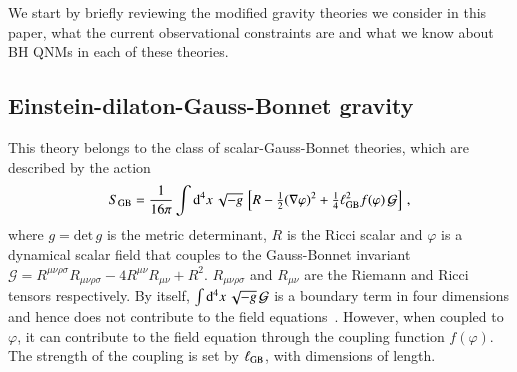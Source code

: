 \documentclass[twocolumn,
               prd,
               aps,
               superscriptaddress,
               tightenlines,
               nofootinbib,
               eqsecnum,
               amsfonts,
               amsmath,
               longbibliography]{revtex4-1}
\newcommand{\dV}{{\rm d}^{4}x \, \sqrt{-g} \,}
\begin{document}
We start by briefly reviewing the modified gravity theories we consider in this
paper, what the current observational constraints are and what we know
about BH QNMs in each of these theories.

\subsection{Einstein-dilaton-Gauss-Bonnet gravity}
\label{sec:review_edgb}

This theory belongs to the class of scalar-Gauss-Bonnet theories, which are
described by the action
%
\begin{equation} \label{eq:action_sgb}
    S_{\rm GB} = \frac{1}{16 \pi}
    \int \dV
    \left[
    R - \tfrac{1}{2}(\nabla \varphi)^2
    + \tfrac{1}{4} \ell^{2}_{\rm GB} f(\varphi) \, \mathcal{G}
    \right]\,,
\end{equation}
%
where $g = \textrm{det} \, g$ is the metric determinant, $R$ is the Ricci
scalar and $\varphi$ is a dynamical scalar field that couples to the
Gauss-Bonnet invariant
%
$\mathcal{G} =
R^{\mu\nu\rho\sigma}R_{\mu\nu\rho\sigma}
- 4 R^{\mu\nu}R_{\mu\nu}
+ R^2$.
%
$R_{\mu\nu\rho\sigma}$ and $R_{\mu\nu}$ are the Riemann and Ricci tensors respectively.
%
By itself, $\int \dV \mathcal{G}$ is a boundary term in four dimensions
and hence does not contribute to the field equations~\cite{Myers:1987yn}.
%
However,  when coupled to $\varphi$, it can contribute to the field equation
through the coupling function $f(\varphi)$. The strength of the coupling is
set by $\ell_{\rm GB}$, with dimensions of length.
\end{document}
